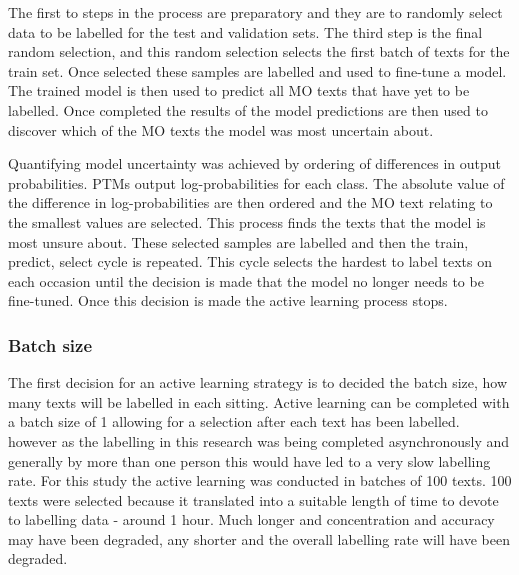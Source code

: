 The first to steps in the process are preparatory and they are to randomly select data to be labelled for the test and validation sets. The third step is the final random selection, and this random selection selects the first batch of texts for the train set. Once selected these samples are labelled and used to fine-tune a model. The trained model is then used to predict all MO texts that have yet to be labelled. Once completed the results of the model predictions are then used to discover which of the MO texts the model was most uncertain about. 

Quantifying model uncertainty was achieved by ordering of differences in output probabilities. PTMs output log-probabilities for each class. The absolute value of the difference in log-probabilities are then ordered and the MO text relating to the smallest values are selected. This process finds the texts that the model is most unsure about. These selected samples are labelled and then the train, predict, select cycle is repeated. This cycle selects the hardest to label texts on each occasion until the decision is made that the model no longer needs to be fine-tuned. Once this decision is made the active learning process stops. 


\subsubsection{Batch size}
The first decision for an active learning strategy is to decided the batch size, how many texts will be labelled in each sitting. Active learning can be completed with a batch size of 1 allowing for a selection after each text has been labelled. however as the labelling in this research was being completed asynchronously and generally by more than one person this would have led to a very slow labelling rate. For this study the active learning was conducted in batches of 100 texts. 100 texts were selected because it translated into a suitable length of time to devote to labelling data - around 1 hour. Much longer and concentration and accuracy may have been degraded, any shorter and the overall labelling rate will have been degraded. 


